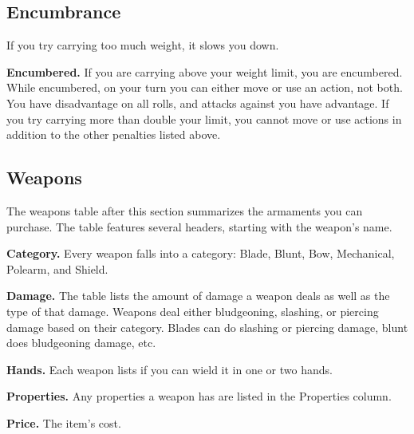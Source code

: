 \documentclass[12pt,letterpaper,twocolumn,openany,nodeprecatedcode,bg=none]{dndbook}
\let\oldsubsection\subsection
\renewcommand{\subsection}[1]{%
  \needspace{5\baselineskip}%
  \oldsubsection{#1}%
}
\begin{document}
\subsection{Encumbrance}\label{encumbrance}

If you try carrying too much weight, it slows you down.

\textbf{Encumbered.} If you are carrying above your weight limit, you
are encumbered. While encumbered, on your turn you can either move or
use an action, not both. You have disadvantage on all rolls, and attacks
against you have advantage. If you try carrying more than double your
limit, you cannot move or use actions in addition to the other penalties
listed above.

\onecolumn

\subsection{Weapons}\label{weapons}

The weapons table after this section summarizes the armaments you can
purchase. The table features several headers, starting with the weapon's
name.

\textbf{Category.} Every weapon falls into a category: Blade, Blunt,
Bow, Mechanical, Polearm, and Shield.

\textbf{Damage.} The table lists the amount of damage a weapon deals as
well as the type of that damage. Weapons deal either bludgeoning,
slashing, or piercing damage based on their category. Blades can do
slashing or piercing damage, blunt does bludgeoning damage, etc.

\textbf{Hands.} Each weapon lists if you can wield it in one or two
hands.

\textbf{Properties.} Any properties a weapon has are listed in the
Properties column.

\textbf{Price.} The item's cost.

\end{document}
